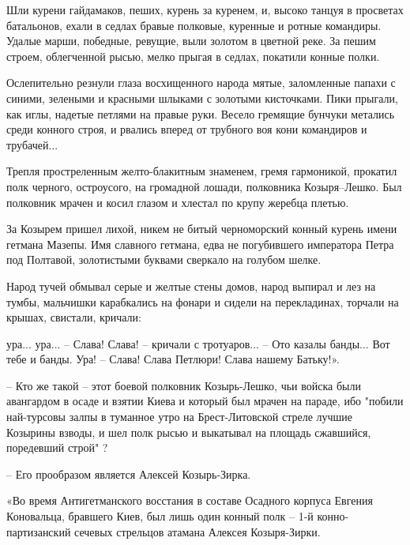

 
Шли курени гайдамаков, пеших, курень за куренем, и, высоко танцуя в
просветах батальонов, ехали в седлах бравые полковые, куренные и ротные
командиры. Удалые марши, победные, ревущие, выли золотом в цветной реке. За
пешим строем, облегченной рысью, мелко прыгая в седлах, покатили конные
полки. 

Ослепительно резнули глаза восхищенного народа мятые, заломленные папахи с
синими, зелеными и красными шлыками с золотыми кисточками. Пики прыгали, как
иглы, надетые петлями на правые руки. Весело гремящие бунчуки метались среди
конного строя, и рвались вперед от трубного воя кони командиров и
трубачей... 

Трепля простреленным желто-блакитным знаменем, гремя гармоникой, прокатил
полк черного, остроусого, на громадной лошади, полковника Козыря–Лешко. Был
полковник мрачен и косил глазом и хлестал по крупу жеребца плетью.

За Козырем пришел лихой, никем не битый черноморский конный курень имени
гетмана Мазепы. Имя славного гетмана, едва не погубившего императора Петра
под Полтавой, золотистыми буквами сверкало на голубом шелке. 

Народ тучей обмывал серые и желтые стены домов, народ выпирал и лез на тумбы,
мальчишки карабкались на фонари и сидели на перекладинах, торчали на крышах,
свистали, кричали:

ура... ура... – Слава! Слава! – кричали с тротуаров... – Ото казалы банды...
Вот тебе и банды. Ура! – Слава! Слава Петлюри! Слава нашему Батьку!».


– Кто же такой – этот боевой полковник Козырь-Лешко, чьи войска были
авангардом в осаде и взятии Киева и который был мрачен на параде, ибо
"побили най-турсовы залпы в туманное утро на Брест-Литовской стреле лучшие
Козырины взводы, и шел полк рысью и выкатывал на площадь сжавшийся,
поредевший строй" ?

– Его прообразом является Алексей Козырь-Зирка.

«Во время Антигетманского восстания в составе Осадного корпуса Евгения
Коновальца, бравшего Киев, был лишь один конный полк – 1-й конно- партизанский
сечевых стрельцов атамана Алексея Козыря-Зирки. 

